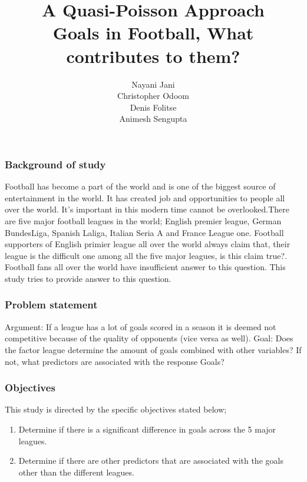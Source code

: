 \documentclass[11pt]{beamer}
\begin{document}
	\author{Nayani Jani\\
		Christopher Odoom\\
		Denis Folitse\\
		Animesh Sengupta\\ }
	\title{\bf{A Quasi-Poisson Approach\\ Goals in Football, What contributes to them? }}

	\begin{frame}[plain]
		\maketitle
	\end{frame}
	
\begin{frame}	
		\frametitle{Background of study}
		Football has become a part of the world and is one of the biggest source of entertainment in the world. It has created job and opportunities to people all over the world. It's important in this modern time cannot be overlooked.There are five major football leagues in the world; English premier league, German BundesLiga, Spanish Laliga, Italian Seria A and France League one. Football supporters of English primier league all over the world always claim that, their league is the difficult one among all the five major leagues, is this claim true?. Football fans all over the world have insufficient answer to this question. This study tries to provide answer to this question.
		
	\end{frame}

	
	\begin{frame}
		\frametitle{Problem statement}
	Argument: If a league has a lot of goals scored in a season it is deemed not competitive because of the quality of opponents (vice versa as well).
	Goal: Does the factor league determine the amount of goals combined with other variables? If not, what predictors are associated with the response Goals?	
	\end{frame}

	\begin{frame}
		\frametitle{Objectives}
		This study is directed by the specific objectives stated below;\\
		\begin{enumerate}
			
			
			\item Determine if there is a significant difference in goals across the 5 major leagues.
			
			\item Determine if there are other predictors that are associated with the goals other than the different leagues.
			
		\end{enumerate}
	\end{frame}
\end{document}
